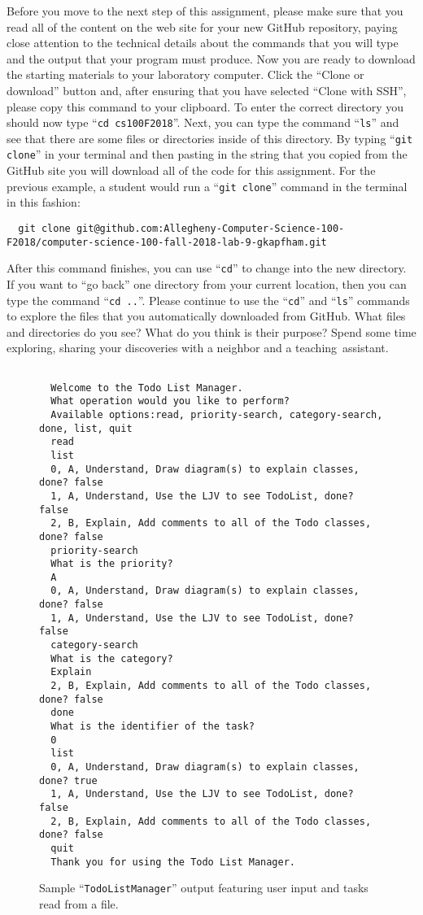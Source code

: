 \documentclass[11pt]{article}
\newcommand{\command}[1]{``\lstinline{#1}''}
\newcommand{\step}[1]{``{#1}''}
\begin{document}
Before you move to the next step of this assignment, please make sure that you
read all of the content on the web site for your new GitHub repository, paying
close attention to the technical details about the commands that you will type
and the output that your program must produce. Now you are ready to download the
starting materials to your laboratory computer. Click the ``Clone or download''
button and, after ensuring that you have selected ``Clone with SSH'', please
copy this command to your clipboard. To enter the correct directory you should
now type \command{cd cs100F2018}. Next, you can type the command \command{ls}
and see that there are some files or directories inside of this directory. By
typing \command{git clone} in your terminal and then pasting in the string that
you copied from the GitHub site you will download all of the code for this
assignment. For the previous example, a student would run a \command{git clone}
command in the terminal in this fashion:

\begin{lstlisting}
  git clone git@github.com:Allegheny-Computer-Science-100-F2018/computer-science-100-fall-2018-lab-9-gkapfham.git
\end{lstlisting}

After this command finishes, you can use \command{cd} to change into the new
directory. If you want to \step{go back} one directory from your current
location, then you can type the command \command{cd ..}. Please continue to use
the \command{cd} and \command{ls} commands to explore the files that you
automatically downloaded from GitHub. What files and directories do you see?
What do you think is their purpose? Spend some time exploring, sharing your
discoveries with a neighbor and a \mbox{teaching assistant}.

\begin{figure}[tb]
  \begin{Verbatim}[commandchars=\\\{\}]

  Welcome to the Todo List Manager.
  What operation would you like to perform?
  Available options:read, priority-search, category-search, done, list, quit
  read
  list
  0, A, Understand, Draw diagram(s) to explain classes, done? false
  1, A, Understand, Use the LJV to see TodoList, done? false
  2, B, Explain, Add comments to all of the Todo classes, done? false
  priority-search
  What is the priority?
  A
  0, A, Understand, Draw diagram(s) to explain classes, done? false
  1, A, Understand, Use the LJV to see TodoList, done? false
  category-search
  What is the category?
  Explain
  2, B, Explain, Add comments to all of the Todo classes, done? false
  done
  What is the identifier of the task?
  0
  list
  0, A, Understand, Draw diagram(s) to explain classes, done? true
  1, A, Understand, Use the LJV to see TodoList, done? false
  2, B, Explain, Add comments to all of the Todo classes, done? false
  quit
  Thank you for using the Todo List Manager.
\end{Verbatim}
\vspace*{-.1in}
\caption{Sample ``{\tt TodoListManager}'' output featuring user input and tasks read from a file.}
\label{fig:output}
\end{figure}
\end{document}
